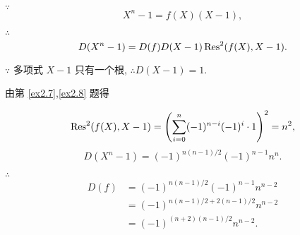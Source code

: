 \documentclass[UTF8]{ctexart}
\begin{document}
\begin{solution}
    $\because$
    \[X^n-1=f(X)(X-1),\]

    $\therefore$
    \[D(X^n-1)=D(f)D(X-1)\operatorname{Res} ^2(f(X),X-1).\]

    $\because$ 多项式 $X-1$ 只有一个根, $\therefore D(X-1)=1$.

    由第 \ref{ex2.7},\ref{ex2.8} 题得

    \[\operatorname{Res} ^2(f(X),X-1)=\left(\sum\limits_{i=0}^n(-1)^{n-i}(-1)^i\cdot1\right)^2=n^2,\]
    \[D(X^n-1)=(-1)^{n(n-1)/2}(-1)^{n-1}n^n.\]

    $\therefore$
    \begin{align*}
        D(f) & =(-1)^{n(n-1)/2}(-1)^{n-1}n^{n-2} \\
        & =(-1)^{n(n-1)/2+2(n-1)/2}n^{n-2} \\
        & =(-1)^{(n+2)(n-1)/2}n^{n-2}.
    \end{align*}
\end{solution}
\end{document}
